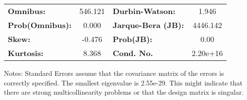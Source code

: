 \begin{center}
\begin{tabular}{lcccccc}
\bottomrule
\end{tabular}
\begin{tabular}{lclc}
\textbf{Omnibus:}       & 546.121 & \textbf{  Durbin-Watson:     } &    1.946  \\
\textbf{Prob(Omnibus):} &   0.000 & \textbf{  Jarque-Bera (JB):  } & 4446.142  \\
\textbf{Skew:}          &  -0.476 & \textbf{  Prob(JB):          } &     0.00  \\
\textbf{Kurtosis:}      &   8.368 & \textbf{  Cond. No.          } & 2.20e+16  \\
\bottomrule
\end{tabular}
\end{center}

Notes: \newline
 [1] Standard Errors assume that the covariance matrix of the errors is correctly specified. \newline
 [2] The smallest eigenvalue is 2.55e-29. This might indicate that there are \newline
 strong multicollinearity problems or that the design matrix is singular.